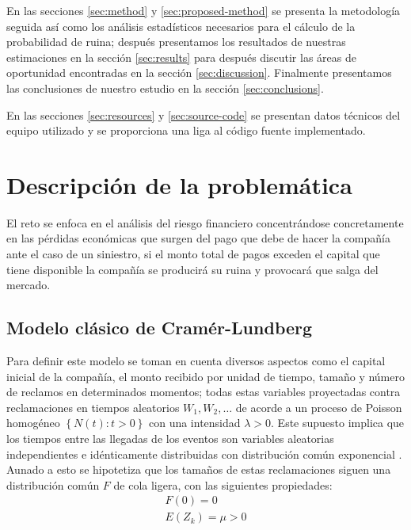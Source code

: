 \documentclass[journal]{IEEEtran}
\begin{document}
        En las secciones \ref{sec:method} y \ref{sec:proposed-method} se presenta la metodología seguida así como los análisis estadísticos necesarios para el cálculo de la probabilidad de ruina; después presentamos los resultados de nuestras estimaciones en la sección \ref{sec:results} para después discutir las áreas de oportunidad encontradas en la sección \ref{sec:discussion}. Finalmente presentamos las conclusiones de nuestro estudio en la sección \ref{sec:conclusions}.

        En las secciones \ref{sec:resources} y \ref{sec:source-code} se presentan datos técnicos del equipo utilizado y se proporciona una liga al código fuente implementado.
        
    \section{Descripción de la problemática} \label{sec:problem-description}
    
        El reto se enfoca en el análisis del riesgo financiero concentrándose concretamente en las pérdidas económicas que surgen del pago que debe de hacer la compañía ante el caso de un siniestro, si el monto total de pagos exceden el capital que tiene disponible la compañía se producirá su ruina y provocará que salga del mercado. 
    
        \subsection{Modelo clásico de Cramér-Lundberg}\label{cap:CL}
        
            Para definir este modelo se toman en cuenta diversos aspectos como el capital inicial de la compañía, el monto recibido por unidad de tiempo, tamaño y número de reclamos en determinados momentos; todas estas variables proyectadas contra reclamaciones en tiempos aleatorios $W_1, W_2, \ldots$ de acorde a un proceso de Poisson homogéneo $\left\{N(t): t > 0\right\}$ con una intensidad $\lambda > 0$. Este supuesto implica que los tiempos entre las llegadas de los eventos son variables aleatorias independientes e idénticamente distribuidas con distribución común exponencial \cite{ekaterina}. Aunado a esto se hipotetiza que los tamaños de estas reclamaciones siguen una distribución común $F$ de cola ligera, con las siguientes propiedades:
            \begin{gather*}
                F(0) = 0 \\
                E(Z_k) = \mu >0
            \end{gather*}
\end{document}
